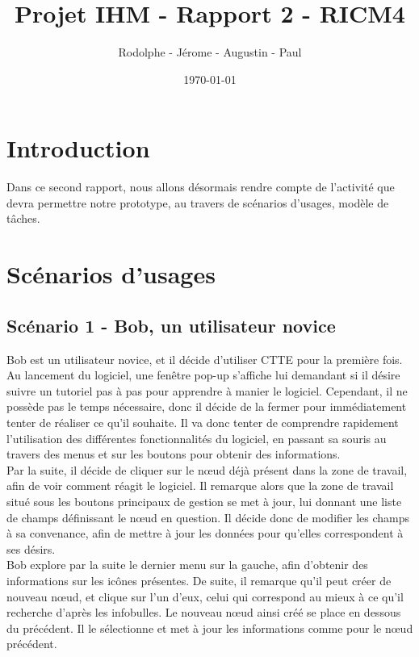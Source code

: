 \documentclass[12pt, a4paper]{article}
\title{Projet IHM - Rapport 2 - RICM4}
\author{\bsc{Fréby} Rodolphe - \bsc{Barbier} Jérome - \bsc{Husson} Augustin - \bsc{Labat} Paul}
\date{\today}
\begin{document}
\maketitle
\tableofcontents
\newpage

\section{Introduction}
Dans ce second rapport, nous allons désormais rendre compte de l'activité que devra permettre notre prototype, au travers de scénarios d'usages, modèle de tâches.

\section{Scénarios d'usages}
\subsection{Scénario 1 - Bob, un utilisateur novice}


Bob est un utilisateur novice, et il décide d'utiliser CTTE pour la première fois. Au lancement du logiciel, une fenêtre pop-up s'affiche lui demandant si il désire suivre un tutoriel pas à pas pour apprendre à manier le logiciel. Cependant, il ne possède pas le temps nécessaire, donc il décide de la fermer pour immédiatement tenter de réaliser ce qu'il souhaite. Il va donc tenter de comprendre rapidement l'utilisation des différentes fonctionnalités du logiciel, en passant sa souris au travers des menus et sur les boutons pour obtenir des informations.\\ 


Par la suite, il décide de cliquer sur le nœud déjà présent dans la zone de travail, afin de voir comment réagit le logiciel. Il remarque alors que la zone de travail situé sous les boutons principaux de gestion se met à jour, lui donnant une liste de champs définissant le nœud en question. Il décide donc de modifier les champs à sa convenance, afin de mettre à jour les données pour qu'elles correspondent à ses désirs.\\


Bob explore par la suite le dernier menu sur la gauche, afin d'obtenir des informations sur les icônes présentes. De suite, il remarque qu'il peut créer de nouveau nœud, et clique sur l'un d'eux, celui qui correspond au mieux à ce qu'il recherche d'après les infobulles. Le nouveau nœud ainsi créé se place en dessous du précédent. Il le sélectionne et met à jour les informations comme pour le nœud précédent. \\
\end{document}
